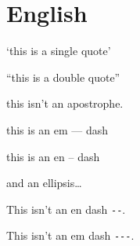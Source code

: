 
\def\mytitle{MultiMarkdown English Test}


\part{English}
\label{english}

`this is a single quote'

``this is a double quote''

this isn't an apostrophe.

this is an em --- dash

this is an en -- dash

and an ellipsis{\ldots}

This isn't an en dash \texttt{-{}-{}}.

This isn't an em dash \texttt{-{}-{}-{}}.




